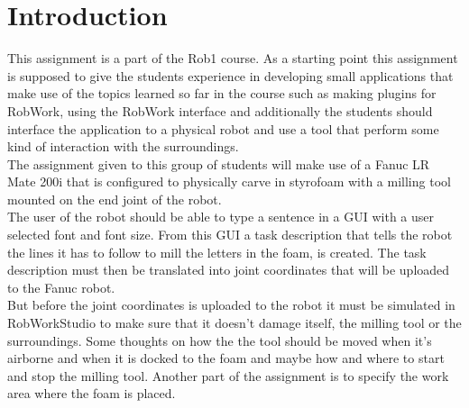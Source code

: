 \section{Introduction}
\label{sec:intro}

This assignment is a part of the Rob1 course. As a starting point this assignment is supposed to give the students experience in developing small applications that make use of the topics learned so far in the course such as making plugins for RobWork, using the RobWork interface and additionally the students should interface the application to a physical robot and use a tool that perform some kind of interaction with the surroundings.
\\The assignment given to this group of students will make use of a Fanuc LR Mate 200i that is configured to physically carve in styrofoam with a milling tool mounted on the end joint of the robot.
\\The user of the robot should be able to type a sentence in a GUI with a user selected font and font size. From this GUI a task description that tells the robot the lines it has to follow to mill the letters in the foam, is created. The task description must then be translated into joint coordinates that will be uploaded to the Fanuc robot.
\\But before the joint coordinates is uploaded to the robot it must be simulated in RobWorkStudio to make sure that it doesn't damage itself, the milling tool or the surroundings. Some thoughts on how the the tool should be moved when it's airborne and when it is docked to the foam and maybe how and where to start and stop the milling tool. Another part of the assignment is to specify the work area where the foam is placed.
